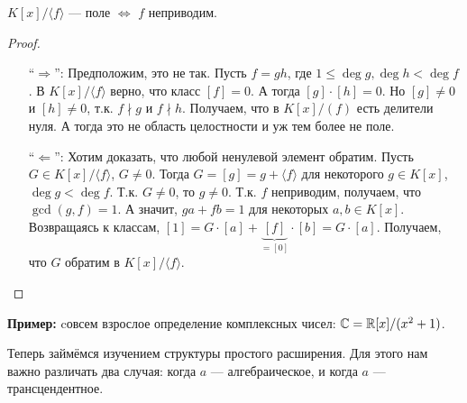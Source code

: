 \begin{lemma}
    $K[x] / \langle f \rangle$ --- поле $\Longleftrightarrow$ $f$ неприводим.
\end{lemma}
\begin{proof} $ $

    \begin{itemize}
        \item[``$\Longrightarrow$'':] Предположим, это не так. Пусть $f = gh$, где $1 \leqslant \deg g, \deg h < \deg f$. В $K[x]/\langle f \rangle$ верно, что класс $[f] = 0$. А тогда $[g] \cdot [h] = 0$. Но $[g] \neq 0$ и $[h] \neq 0$, т.к. $f \nmid g$ и $f \nmid h$. Получаем, что в $K[x]/(f)$ есть делители нуля. А тогда это не область целостности и уж тем более не поле.

        \item[``$\Longleftarrow$'':] Хотим доказать, что любой ненулевой элемент обратим. Пусть $G \in K[x] / \langle f \rangle$, $G \neq 0$. Тогда $G = [g] = g + \langle f \rangle$ для некоторого $g \in K[x]$, $\deg g < \deg f$. Т.к. $G \neq 0$, то $g \neq 0$. Т.к. $f$ неприводим, получаем, что $\gcd(g, f) = 1$. А значит, $ga + fb = 1$ для некоторых $a, b \in K[x]$. Возвращаясь к классам, $[1] = G \cdot [a] + \underbrace{[f]}_{=[0]} \cdot [b] = G \cdot [a]$. Получаем, что $G$ обратим в $K[x] / \langle f \rangle$.
    \end{itemize}
\end{proof}

\textbf{Пример:} cовсем взрослое определение комплексных чисел: $\mathbb{C} = \mathbb{R}[x] / (x^2 + 1)$. 

Теперь займёмся изучением структуры простого расширения. Для этого нам важно различать два случая: когда $a$ --- алгебраическое, и когда $a$ --- трансцендентное.

